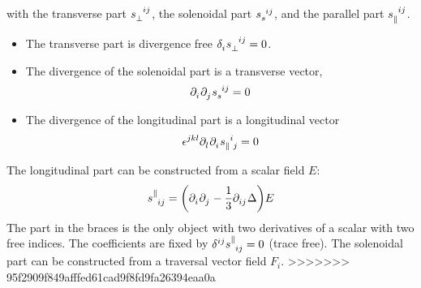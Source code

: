 with the transverse part $\tensor{s}{_\perp^i^j}$, the solenoidal part $\tensor{s}{_s^i^j}$,
and the parallel part $\tensor{s}{_\parallel^i^j}$.
\begin{itemize}
    \item The transverse part is divergence free $ \tensor{\delta}{_i} \tensor{s}{_\perp^i^j} = 0$.
    \item The divergence of the solenoidal part is a transverse vector,
    \begin{equation}
        \tensor{\partial}{_i} \tensor{\partial}{_j} \tensor{s}{_s^i^j} = 0
    \end{equation}
    \item The divergence of the longitudinal part is a longitudinal vector
    \begin{equation}
        \tensor{\epsilon}{^j^k^l} \tensor{\partial}{_l} \tensor{\partial}{_i} \tensor{s}{_\parallel^i_j} = 0
    \end{equation}
\end{itemize}
The longitudinal part can be constructed from a scalar field $E$:
\begin{equation}
    \tensor{s}{^\parallel_i_j} = \left( \tensor{\partial}{_i} \tensor{\partial}{_j} - \frac{1}{3} \tensor{\partial}{_i_j} \Delta \right) E
\end{equation}
The part in the braces is the only object with two derivatives of a scalar with two free indices. 
The coefficients are fixed by $ \tensor{\delta}{^i^j} \tensor{s}{^\parallel_i_j} = 0$ (trace free).
The solenoidal part can be constructed from a traversal vector field $F_i$.
>>>>>>> 95f2909f849afffed61cad9f8fd9fa26394eaa0a

